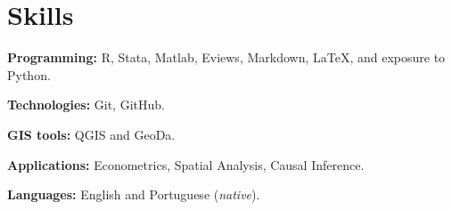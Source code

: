 \documentclass[letterpaper,11pt]{article}
\makeatletter
\newcommand{\resumeItem}[1]{
  \item\small{
    {#1 \vspace{-2pt}}
  }
}
\newcommand{\resumeProjectHeading}[2]{
    \vspace{-2pt}\item
    \begin{tabular*}{0.97\textwidth}{l@{\extracolsep{\fill}}r}
      \small#1 & #2 \\
    \end{tabular*}\vspace{-7pt}
}
\newcommand{\resumeSubHeadingListStart}{\begin{itemize}[leftmargin=0.15in, label={}]}
\newcommand{\resumeSubHeadingListEnd}{\end{itemize}}
\newcommand{\resumeItemListStart}{\begin{itemize}}
\newcommand{\resumeItemListEnd}{\end{itemize}\vspace{-5pt}}
\makeatother
\begin{document}

\section{Skills}
\vspace{2pt}
  
  \resumeSubHeadingListStart
    \small{\item{
        \textbf{Programming:}{ R, Stata, Matlab, Eviews, Markdown, LaTeX, and exposure to Python.} \\ \vspace{3pt}
             
        \textbf{Technologies:}{ Git, GitHub.} \\ \vspace{3pt}

        \textbf{GIS tools:}{ QGIS and GeoDa.} \\ \vspace{3pt}

        \textbf{Applications:}{ Econometrics, Spatial Analysis, Causal Inference.} \\ \vspace{3pt}
        
        \textbf{Languages:}{ English and Portuguese (\textit{native}).}
        
    }}
  \resumeSubHeadingListEnd















      
      
\end{document}
